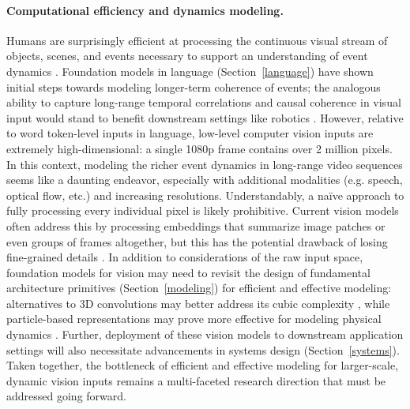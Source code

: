 \paragraph{Computational efficiency and dynamics modeling.} Humans are surprisingly efficient at processing the continuous visual stream of objects, scenes, and events necessary to support an understanding of event dynamics \cite{zacks2001perceiving, tversky2013event}. Foundation models in language (Section~\ref{language}) have shown initial steps towards modeling longer-term coherence of events; the analogous ability to capture long-range temporal correlations and causal coherence in visual input would stand to benefit downstream settings like robotics \citep[][Section~\ref{robotics}]{dai2019transformer,alyamkin2019low, goel2020survey,feng2019computer}. However, relative to word token-level inputs in language, low-level computer vision inputs are extremely high-dimensional: a single 1080p frame contains over 2 million pixels. In this context, modeling the richer event dynamics in long-range video sequences seems like a daunting endeavor, especially with additional modalities (e.g. speech, optical flow, etc.) and increasing resolutions. Understandably, a na\"{i}ve approach to fully processing every individual pixel is likely prohibitive. Current vision models \citep[e.g. ][]{radford2021learning,sun2019videobert,tan2019lxmert,kim2021vilt} often address this by processing embeddings that summarize image patches or even groups of frames altogether, but this has the potential drawback of losing fine-grained details \cite{ramesh2021zeroshot}. In addition to considerations of the raw input space, foundation models for vision may need to revisit the design of fundamental architecture primitives (Section~\ref{modeling}) for efficient and effective modeling: alternatives to 3D convolutions may better address its cubic complexity \cite{fanbuch2020rubiks,sitzmann2019scene}, while particle-based representations may prove more effective for modeling physical dynamics \cite{bear2021physion}. Further, deployment of these vision models to downstream application settings will also necessitate advancements in systems design (Section~\ref{systems}). Taken together, the bottleneck of efficient and effective modeling for larger-scale, dynamic vision inputs remains a multi-faceted research direction that must be addressed going forward.

